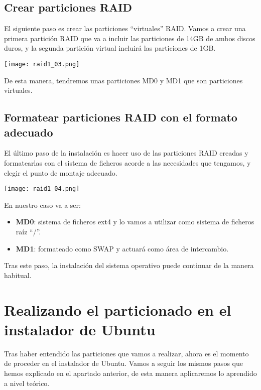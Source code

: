 \subsection{Crear particiones RAID}
El siguiente paso es crear las particiones “virtuales” RAID. Vamos a crear una primera partición RAID que va a incluir las particiones de 14GB de ambos discos duros, y la segunda partición virtual incluirá las particiones de 1GB.

\begin{center}
    \vspace{-10pt}
    \texttt{[image: raid1\_03.png]}
    \vspace{-20pt}
\end{center}

De esta manera, tendremos unas particiones MD0 y MD1 que son particiones virtuales.

\subsection{Formatear particiones RAID con el formato adecuado}
El último paso de la instalación es hacer uso de las particiones RAID creadas y formatearlas con el sistema de ficheros acorde a las necesidades que tengamos, y elegir el punto de montaje adecuado.

\begin{center}
    \vspace{-10pt}
    \texttt{[image: raid1\_04.png]}
    \vspace{-20pt}
\end{center}

En nuestro caso va a ser:
\begin{itemize}
    \item  \textbf{MD0}: sistema de ficheros ext4 y lo vamos a utilizar como sistema de ficheros raíz “/”.
    \item  \textbf{MD1}: formateado como SWAP y actuará como área de intercambio.
\end{itemize}

Tras este paso, la instalación del sistema operativo puede continuar de la manera habitual.

\section{Realizando el particionado en el instalador de Ubuntu}
Tras haber entendido las particiones que vamos a realizar, ahora es el momento de proceder en el instalador de Ubuntu. Vamos a seguir los mismos pasos que hemos explicado en el apartado anterior, de esta manera aplicaremos lo aprendido a nivel teórico.

